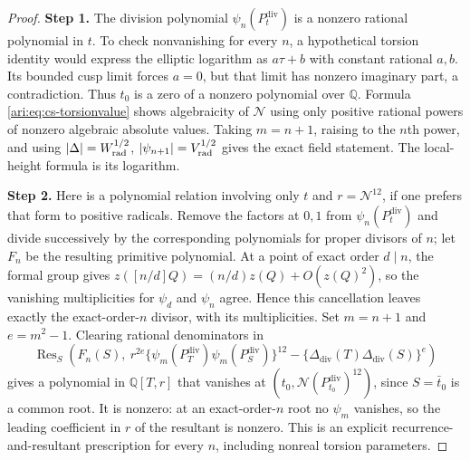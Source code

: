 \documentclass[11pt,a4paper]{article}
\theoremstyle{plain}
\theoremstyle{definition}
\begin{document}
\begin{proof}
\noindent\textbf{Step 1.} The division polynomial $\psi_n(P^{\mathrm{div}}_t)$ is a nonzero rational
polynomial in $t$. To check nonvanishing for every $n$, a hypothetical
torsion identity would express the elliptic logarithm as
$a\tau+b$ with constant rational $a,b$. Its bounded cusp limit
forces $a=0$, but that limit has nonzero imaginary part, a
contradiction. Thus $t_0$ is a zero of a nonzero polynomial over
$\mathbb Q$. Formula \eqref{ari:eq:cs-torsionvalue} shows algebraicity
of $\mathcal N$ using only positive rational powers of nonzero algebraic
absolute values. Taking $m=n+1$, raising to the $n$th power, and
using $|\Delta|=W_{\rm rad}^{1/2}$, $|\psi_{n+1}|=V_{\rm rad}^{1/2}$ gives the exact
field statement. The local-height formula is its logarithm.


\noindent\textbf{Step 2.} Here is a polynomial relation involving only $t$ and $r=\mathcal N^{12}$,
if one prefers that form to positive radicals. Remove the factors
at $0,1$ from $\psi_n(P^{\mathrm{div}}_t)$ and divide successively by the
corresponding polynomials for proper divisors of $n$; let $F_n$ be
the resulting primitive polynomial. At a point of exact order
$d\mid n$, the formal group gives
$z([n/d]Q)=(n/d)z(Q)+O(z(Q)^2)$, so the vanishing multiplicities for
$\psi_d$ and $\psi_n$ agree. Hence this cancellation leaves exactly
the exact-order-$n$ divisor, with its multiplicities. Set
$m=n+1$ and $e=m^2-1$. Clearing rational denominators in
\[
 \operatorname{Res}_S\left(
 F_n(S),\
 r^{2e}\{\psi_m(P^{\mathrm{div}}_T)\psi_m(P^{\mathrm{div}}_S)\}^{12}
              -\{\Delta_{\mathrm{div}}(T)\Delta_{\mathrm{div}}(S)\}^{e}\right)
\]
gives a polynomial in $\mathbb Q[T,r]$ that vanishes at
$(t_0,\mathcal N(P^{\mathrm{div}}_{t_0})^{12})$, since $S=\bar t_0$ is a common root.
It is nonzero: at an exact-order-$n$ root no $\psi_m$ vanishes,
so the leading coefficient in $r$ of the resultant is nonzero.
This is an explicit recurrence-and-resultant prescription for
every $n$, including nonreal torsion parameters.
\end{proof}
\end{document}
